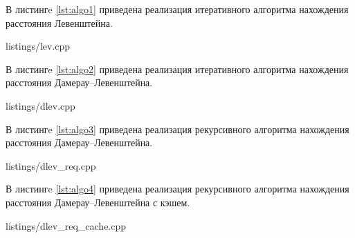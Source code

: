 В листингe \ref{lst:algo1} приведена реализация итеративного алгоритма нахождения расстояния Левенштейна.


\begin{lstinputlisting}[
	label={lst:algo1},
	caption={Итеративный алгоритм нахождения расстояния Левенштейна},
	]{listings/lev.cpp}
\end{lstinputlisting}

\newpage
В листингe \ref{lst:algo2} приведена реализация итеративного алгоритма нахождения расстояния Дамерау--Левенштейна.

\begin{lstinputlisting}[
	caption={Итеративный алгоритм нахождения расстояния Дамерау--Левенштейна},
	label={lst:algo2}
	]{listings/dlev.cpp}
\end{lstinputlisting}

\newpage
В листингe \ref{lst:algo3} приведена реализация рекурсивного алгоритма нахождения расстояния Дамерау--Левенштейна.

\begin{lstinputlisting}[
	caption={Рекурсивный алгоритм нахождения расстояния Дамерау--Левенштейна},
	label={lst:algo3}
	]{listings/dlev_req.cpp}
\end{lstinputlisting}

\newpage
В листингe \ref{lst:algo4} приведена реализация рекурсивного алгоритма нахождения расстояния Дамерау--Левенштейна с кэшем.

\begin{lstinputlisting}[
	caption={Рекурсивный алгоритм нахождения расстояния Дамерау--Левенштейна с кэшем},
	label={lst:algo4}
	]{listings/dlev_req_cache.cpp}
\end{lstinputlisting}